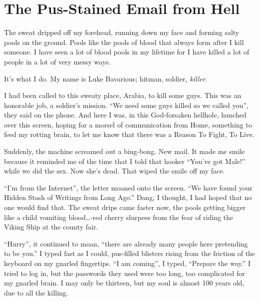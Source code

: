  



\chapter{The Pus-Stained Email from Hell}


The sweat dripped off my forehead, running down my face and forming
salty pools on the ground. Pools like the pools of blood that
always form after I kill someone. I have seen a lot of blood pools
in my lifetime for I have killed a lot of people in a lot of very
messy ways.



It's what I do. My name is Luke Bavarious; hitman, soldier,
{\em killer}.



I had been called to this sweaty place, Arabia, to kill some guys.
This was an honorable job, a soldier's mission. ``We need some guys
killed so we called you'', they said on the phone. And here I was,
in this God-forsaken hellhole, hunched over this screen, hoping for
a morsel of communication from Home, something to feed my rotting
brain, to let me know that there was a Reason To Fight, To
Live.



Suddenly, the machine screamed out a bing-bong. New mail. It made
me smile because it reminded me of the time that I told that hooker
``You've got Male!'' while we did the sex. Now she's dead. That wiped
the smile off my face.



``I'm from the Internet'', the letter moaned onto the screen. ``We
have found your Hidden Stash of Writings from Long Ago.'' Dang, I
thought, I had hoped that no one would find that. The sweat drips
came faster now, the pools getting bigger like a child vomiting
blood{\ldots}-red cherry slurpees from the fear of riding the Viking
Ship at the county fair.



``Hurry'', it continued to moan, ``there are already many people here
pretending to be you.'' I typed fast as I could, pus-filled blisters
rising from the friction of the keyboard on my gnarled fingertips.
``I am coming'', I typed, ``Prepare the way.'' I tried to log in, but
the passwords they used were too long, too complicated for my
gnarled brain. I may only be thirteen, but my soul is almost 100
years old, due to all the killing.



